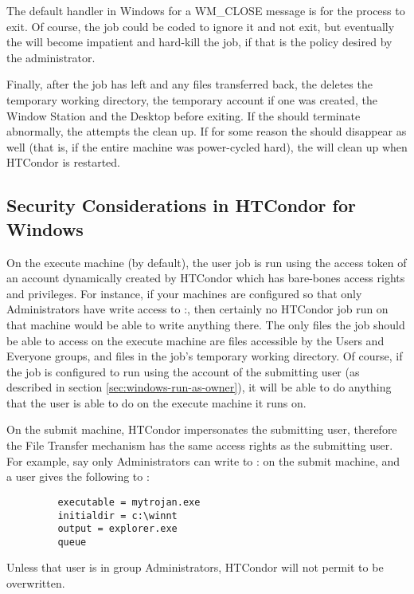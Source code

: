 \Note The default handler in Windows for a WM\_CLOSE message is for the
process to exit.  Of course, the job could be coded to ignore it and not
exit, but eventually the  will become impatient and hard-kill
the job, if that is the policy desired by the administrator.

Finally, after the job has left and any files transferred back, 
the  deletes the temporary working directory, 
the temporary account if one was created,
the Window Station and the Desktop before exiting. 
If the  should terminate abnormally, 
the  attempts the clean up.  
If for some reason the  should disappear as well
(that is, if the entire machine was power-cycled hard),
the  will clean up when HTCondor is restarted.

\subsection{Security Considerations in HTCondor for Windows}


On the execute machine (by default), the user job is run using the
access token of an account dynamically created by HTCondor which has
bare-bones access rights and privileges.  For instance, if your
machines are configured so that only Administrators have write access
to
\verb@C:\WINNT@, then certainly no HTCondor job run on that machine
would be able to write anything there.  The only files the job should
be able to access on the execute machine are files accessible by the
Users and Everyone groups, and files in the job's temporary working
directory.  Of course, if the job is configured to run using the
account of the submitting user (as described in section
\ref{sec:windows-run-as-owner}), it will be able to do anything that
the user is able to do on the execute machine it runs on.

On the submit machine, HTCondor impersonates the submitting user, therefore
the File Transfer mechanism has the same access rights as the submitting
user.  For example, say only Administrators can write to
\verb@C:\WINNT@
on the submit machine,
and a user gives the following to  :
\begin{verbatim}
         executable = mytrojan.exe
         initialdir = c:\winnt
         output = explorer.exe
         queue
\end{verbatim}
Unless that user is in group Administrators, HTCondor will not permit
 to be overwritten.  

